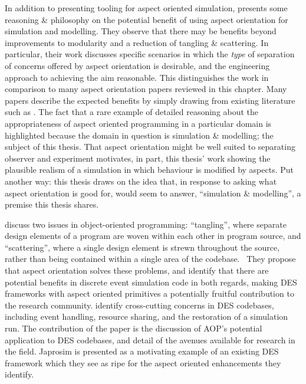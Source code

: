 In addition to presenting tooling for aspect oriented simulation,
\citet{gulyas1999use} presents some reasoning \& philosophy on the potential
benefit of using aspect orientation for simulation and modelling. They observe
that there may be benefits beyond improvements to modularity and a reduction of
tangling \& scattering. In particular, their work discusses specific scenarios
in which the \emph{type} of separation of concerns offered by aspect orientation
is desirable, and the engineering approach to achieving the aim reasonable. This
distinguishes the work in comparison to many aspect orientation papers reviewed
in this chapter. Many papers describe the expected benefits by simply drawing
from existing literature such as \cite{kiczales1997aspect}. The fact
that a rare example of detailed reasoning about the appropriateness of aspect
oriented programming in a particular domain is highlighted because the domain in
question is simulation \& modelling; the subject of this thesis. That aspect
orientation might be well suited to separating observer and experiment
motivates, in part, this thesis' work showing the plausible realism of a
simulation in which behaviour is modified by aspects. Put another way: this
thesis draws on the idea that, in response to \citeauthor{steimann06paradoxical}
asking what aspect orientation is good for, \citeauthor{gulyas1999use} would
seem to answer, ``simulation \& modelling'', a premise this thesis shares.

\citeauthor{chibani2013toward} discuss two issues in object-oriented
programming: ``tangling'', where separate design elements of a program are woven
within each other in program source, and ``scattering'', where a single design
element is strewn throughout the source, rather than being contained within a
single area of the codebase.~
They propose that aspect orientation solves these problems, and identify that
there are potential benefits in discrete event simulation  code in both regards,
making DES frameworks with aspect oriented primitives a potentially fruitful
contribution to the research community. \citeauthor{chibani2013toward} identify
cross-cutting concerns in DES codebases, including event handling, resource
sharing, and the restoration of a simulation run. The contribution of the paper
is the discussion of AOP's potential application to DES codebases, and detail of
the avenues available for research in the field. Japrosim is presented as a
motivating example of an existing DES framework which they see as ripe for the
aspect oriented enhancements they identify. 

